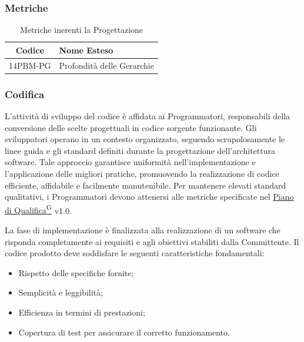 \subsubsection{Metriche}
\begin{table}[h!]
    \centering
    \caption{Metriche inerenti la Progettazione}
    \label{tab:metriche_progettazione}
    \begin{tabular}{|c|l|}
        \hline
        \textbf{Codice} & \textbf{Nome Esteso} \\ 
        \hline
        14PBM-PG         & Profondità delle Gerarchie \\ 
        \hline
    \end{tabular}
\end{table}






\subsubsection{Codifica}
L'attività di sviluppo del codice è affidata ai Programmatori, responsabili della conversione delle scelte progettuali in codice sorgente funzionante. Gli sviluppatori operano in un contesto organizzato, seguendo scrupolosamente le linee guida e gli standard definiti durante la progettazione dell'architettura software. Tale approccio garantisce uniformità nell'implementazione e l'applicazione delle migliori pratiche, promuovendo la realizzazione di codice efficiente, affidabile e facilmente manutenibile. 
Per mantenere elevati standard qualitativi, i Programmatori devono attenersi alle metriche specificate nel \href{https://code7crusaders.github.io/docs/RTB/documentazione_interna/glossario.html#piano-di-qualifica}{Piano di Qualifica\textsuperscript{G}} v1.0.

La fase di implementazione è finalizzata alla realizzazione di un software che risponda completamente ai requisiti e agli obiettivi stabiliti dalla Committente. Il codice prodotto deve soddisfare le seguenti caratteristiche fondamentali:
\begin{itemize}
    \item Rispetto delle specifiche fornite;
    \item Semplicità e leggibilità;
    \item Efficienza in termini di prestazioni;
    \item Copertura di test per assicurare il corretto funzionamento.
\end{itemize}

